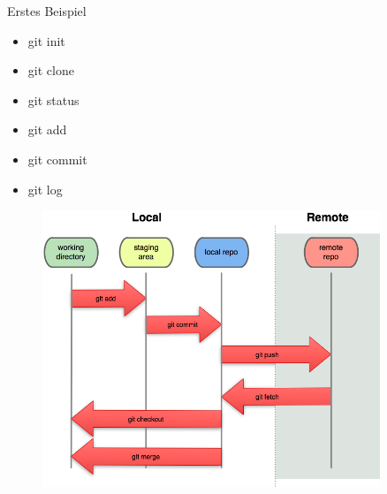 \documentclass{beamer}
\begin{document}
\begin{frame}

  \begin{block}{Erstes Beispiel}
    \begin{itemize}
      \item git init
      \item git clone
      \item git status
      \item git add
      \item git commit
      \item git log
    \end{itemize}
  \end{block} 

\end{frame}

\begin{frame}

 \begin{figure}
  \includegraphics[width=0.90\textwidth]{./images/local-remote.png}
 \end{figure}

\end{frame}
\end{document}
